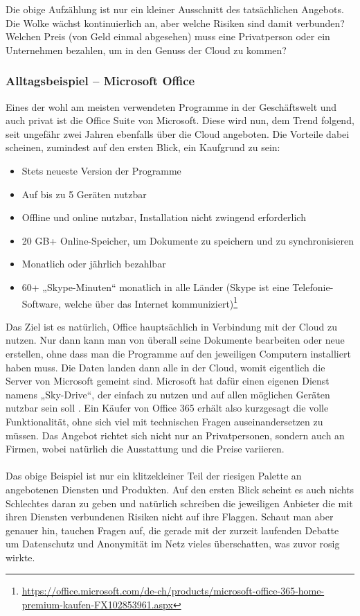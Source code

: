 Die obige Aufzählung ist nur ein kleiner Ausschnitt des tatsächlichen Angebots. Die Wolke wächst kontinuierlich an, aber welche Risiken sind damit verbunden? Welchen Preis (von Geld einmal abgesehen) muss eine Privatperson oder ein Unternehmen bezahlen, um in den Genuss der Cloud zu kommen?

\subsubsection{Alltagsbeispiel – Microsoft Office}
Eines der wohl am meisten verwendeten Programme in der Geschäftswelt und auch privat ist die Office Suite von Microsoft. Diese wird nun, dem Trend folgend, seit ungefähr zwei Jahren ebenfalls über die Cloud angeboten. Die Vorteile dabei scheinen, zumindest auf den ersten Blick, ein Kaufgrund zu sein:

\begin{itemize}
\item Stets neueste Version der Programme
\item Auf bis zu 5 Geräten nutzbar
\item Offline und online nutzbar, Installation nicht zwingend erforderlich
\item 20 GB+ Online-Speicher, um Dokumente zu speichern und zu synchronisieren
\item Monatlich oder jährlich bezahlbar
\item 60+ „Skype-Minuten“ monatlich in alle Länder (Skype ist eine Telefonie-Software, welche über das Internet kommuniziert)\footnote{\url{https://office.microsoft.com/de-ch/products/microsoft-office-365-home-premium-kaufen-FX102853961.aspx}}
\end{itemize}

Das Ziel ist es natürlich, Office hauptsächlich in Verbindung mit der Cloud zu nutzen. Nur dann kann man von überall seine Dokumente bearbeiten oder neue erstellen, ohne dass man die Programme auf den jeweiligen Computern installiert haben muss. Die Daten landen dann alle in der Cloud, womit eigentlich die Server von Microsoft gemeint sind. Microsoft hat dafür einen eigenen Dienst namens „Sky-Drive“, der einfach zu nutzen und auf allen möglichen Geräten nutzbar sein soll . Ein Käufer von Office 365 erhält also kurzgesagt die volle Funktionalität, ohne sich viel mit technischen Fragen auseinandersetzen zu müssen.
Das Angebot richtet sich nicht nur an Privatpersonen, sondern auch an Firmen, wobei natürlich die Ausstattung und die Preise variieren.
\\
\\
Das obige Beispiel ist nur ein klitzekleiner Teil der riesigen Palette an angebotenen Diensten und Produkten. Auf den ersten Blick scheint es auch nichts Schlechtes daran zu geben und natürlich schreiben die jeweiligen Anbieter die mit ihren Diensten verbundenen Risiken nicht auf ihre Flaggen. Schaut man aber genauer hin, tauchen Fragen auf, die gerade mit der zurzeit laufenden Debatte um Datenschutz und Anonymität im Netz vieles überschatten, was zuvor rosig wirkte.


